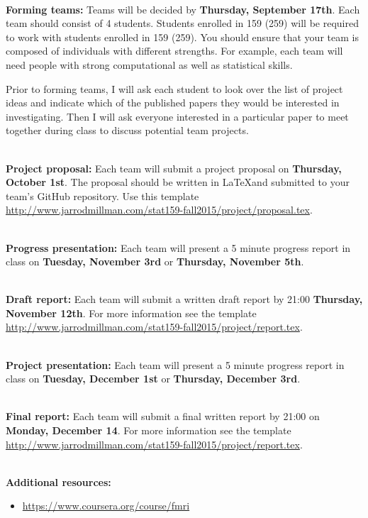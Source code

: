 \documentclass[11pt]{article}
\begin{document}
\textbf {\large \\ Forming teams:}
Teams will be decided by \textbf{Thursday, September 17th}.  Each team
should consist of 4 students.  Students enrolled in 159 (259) will be required
to work with students enrolled in 159 (259).  You should ensure that your team
is composed of individuals with different strengths.  For example, each team
will need people with strong computational as well as statistical skills.

Prior to forming teams, I will ask each student to look over the list of
project ideas and indicate which of the published papers they would be
interested in investigating.  Then I will ask everyone interested in a
particular paper to meet together during class to discuss potential team
projects.

\textbf {\large \\ Project proposal:}
Each team will submit a project proposal on \textbf{Thursday, October
1st}.  The proposal should be written in \LaTeX and submitted to your team's
GitHub repository.  Use this template
\url{http://www.jarrodmillman.com/stat159-fall2015/project/proposal.tex}.

\textbf {\large \\ Progress presentation:}
Each team will present a 5 minute progress report in class
on \textbf{Tuesday, November 3rd} or \textbf{Thursday,  November 5th}.

\textbf {\large \\ Draft report:}
Each team will submit a written draft report by 21:00 \textbf{Thursday,
November 12th}.  For more information see the template
\url{http://www.jarrodmillman.com/stat159-fall2015/project/report.tex}.

\textbf {\large \\ Project presentation:}
Each team will present a 5 minute progress report in class
on \textbf{Tuesday, December 1st} or \textbf{Thursday, December 3rd}.

\textbf {\large \\ Final report:}
Each team will submit a final written report by 21:00 on
\textbf{Monday, December 14}.  For more information see the
template \url{http://www.jarrodmillman.com/stat159-fall2015/project/report.tex}.

\textbf {\large \\ Additional resources:}

\begin{itemize}
\item \url{https://www.coursera.org/course/fmri}
\end{itemize}
\end{document}
